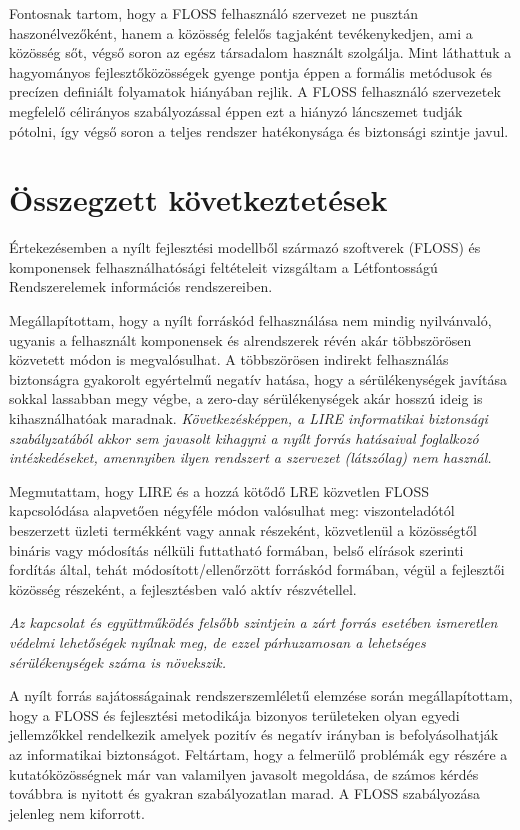 \documentclass[12pt,magyar,a4paper,oneside]{scrreprt}
\begin{document}
Fontosnak tartom, hogy a FLOSS felhasználó szervezet ne pusztán
haszonélvezőként, hanem a közösség felelős tagjaként tevékenykedjen, ami
a közösség sőt, végső soron az egész társadalom használt szolgálja. Mint
láthattuk a hagyományos fejlesztőközösségek gyenge pontja éppen a
formális metódusok és precízen definiált folyamatok hiányában rejlik. A
FLOSS felhasználó szervezetek megfelelő célirányos szabályozással éppen
ezt a hiányzó láncszemet tudják pótolni, így végső soron a teljes
rendszer hatékonysága és biztonsági szintje javul.

\hypertarget{uxf6sszegzett-kuxf6vetkeztetuxe9sek}{%
\section{Összegzett
következtetések}\label{uxf6sszegzett-kuxf6vetkeztetuxe9sek}}

Értekezésemben a nyílt fejlesztési modellből származó szoftverek (FLOSS)
és komponensek felhasználhatósági feltételeit vizsgáltam a Létfontosságú
Rendszerelemek információs rendszereiben.

Megállapítottam, hogy a nyílt forráskód felhasználása nem mindig
nyilvánvaló, ugyanis a felhasznált komponensek és alrendszerek révén
akár többszörösen közvetett módon is megvalósulhat. A többszörösen
indirekt felhasználás biztonságra gyakorolt egyértelmű negatív hatása,
hogy a sérülékenységek javítása sokkal lassabban megy végbe, a zero-day
sérülékenységek akár hosszú ideig is kihasználhatóak maradnak.
\emph{Következésképpen, a LIRE informatikai biztonsági szabályzatából
akkor sem javasolt kihagyni a nyílt forrás hatásaival foglalkozó
intézkedéseket, amennyiben ilyen rendszert a szervezet (látszólag) nem
használ.}

Megmutattam, hogy LIRE és a hozzá kötődő LRE közvetlen FLOSS
kapcsolódása alapvetően négyféle módon valósulhat meg: viszonteladótól
beszerzett üzleti termékként vagy annak részeként, közvetlenül a
közösségtől bináris vagy módosítás nélküli futtatható formában, belső
elírások szerinti fordítás által, tehát módosított/ellenőrzött forráskód
formában, végül a fejlesztői közösség részeként, a fejlesztésben való
aktív részvétellel.

\emph{Az kapcsolat és együttműködés felsőbb szintjein a zárt forrás
esetében ismeretlen védelmi lehetőségek nyílnak meg, de ezzel
párhuzamosan a lehetséges sérülékenységek száma is növekszik.}

A nyílt forrás sajátosságainak rendszerszemléletű elemzése során
megállapítottam, hogy a FLOSS és fejlesztési metodikája bizonyos
területeken olyan egyedi jellemzőkkel rendelkezik amelyek pozitív és
negatív irányban is befolyásolhatják az informatikai biztonságot.
Feltártam, hogy a felmerülő problémák egy részére a kutatóközösségnek
már van valamilyen javasolt megoldása, de számos kérdés továbbra is
nyitott és gyakran szabályozatlan marad. A FLOSS szabályozása jelenleg
nem kiforrott.
\end{document}
